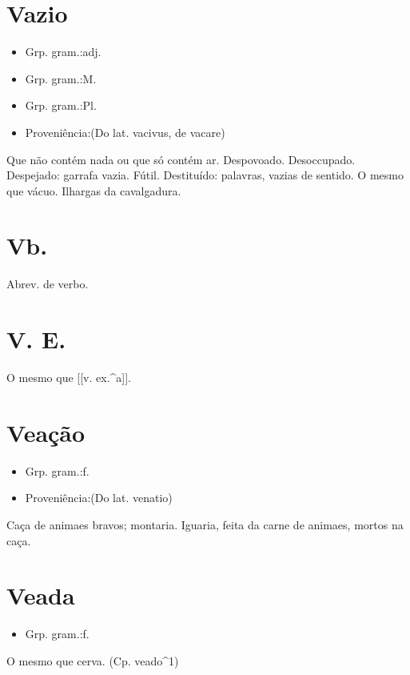 \documentclass{article}
\begin{document}
\section{Vazio}
\begin{itemize}
\item {Grp. gram.:adj.}
\end{itemize}
\begin{itemize}
\item {Grp. gram.:M.}
\end{itemize}
\begin{itemize}
\item {Grp. gram.:Pl.}
\end{itemize}
\begin{itemize}
\item {Proveniência:(Do lat. \textunderscore vacivus\textunderscore , de \textunderscore vacare\textunderscore )}
\end{itemize}
Que não contém nada ou que só contém ar.
Despovoado.
Desoccupado.
Despejado: \textunderscore garrafa vazia\textunderscore .
Fútil.
Destituído: \textunderscore palavras, vazias de sentido\textunderscore .
O mesmo que \textunderscore vácuo\textunderscore .
Ilhargas da cavalgadura.
\section{Vb.}
Abrev. de \textunderscore verbo\textunderscore .
\section{V. E.}
O mesmo que [[v. ex.^a]].
\section{Veação}
\begin{itemize}
\item {Grp. gram.:f.}
\end{itemize}
\begin{itemize}
\item {Proveniência:(Do lat. \textunderscore venatio\textunderscore )}
\end{itemize}
Caça de animaes bravos; montaria.
Iguaria, feita da carne de animaes, mortos na caça.
\section{Veada}
\begin{itemize}
\item {Grp. gram.:f.}
\end{itemize}
O mesmo que cerva.
(Cp. \textunderscore veado\textunderscore ^1)
\end{document}
